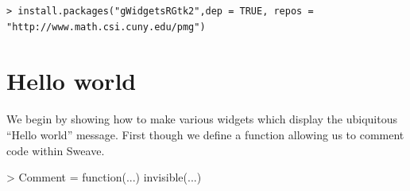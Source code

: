 \documentclass[12pt]{article}
\begin{document}
\begin{verbatim}
> install.packages("gWidgetsRGtk2",dep = TRUE, repos = "http://www.math.csi.cuny.edu/pmg")
\end{verbatim}



\section{Hello world}

We begin by showing how to make various widgets which display the
ubiquitous ``Hello world'' message. First though we define a function
allowing us to comment code within Sweave.
\begin{Schunk}
\begin{Sinput}
> Comment = function(...) invisible(...)
\end{Sinput}
\end{Schunk}
\end{document}
